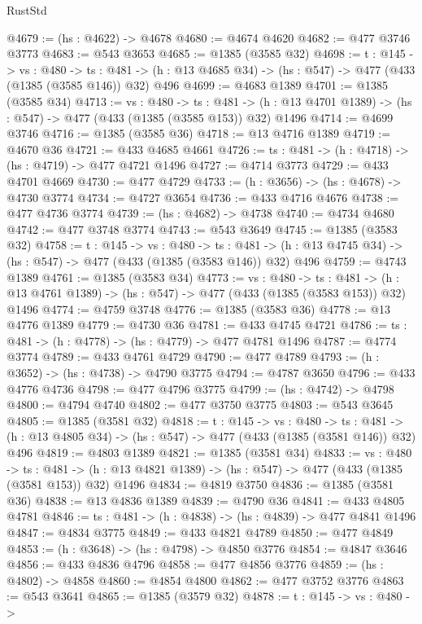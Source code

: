 \begin{lexlean}{RustStd}
\begin{coremodule}
{\begin{coremodule}
{{{{{{{{{{{{{{{{@4679 := (hs : @4622) -> @4678
@4680 := @4674 @4620
@4682 := @477 @3746 @3773
@4683 := @543 @3653
@4685 := @1385 (@3585 @32)
@4698 := {t : @145} ->
  {vs : @480} ->
  {ts : @481} -> (h : @13 @4685 @34) -> (hs : @547) -> @477 (@433 (@1385 (@3585 @146)) @32) @496
@4699 := @4683 @1389
@4701 := @1385 (@3585 @34)
@4713 := {vs : @480} ->
  {ts : @481} -> (h : @13 @4701 @1389) -> (hs : @547) -> @477 (@433 (@1385 (@3585 @153)) @32) @1496
@4714 := @4699 @3746
@4716 := @1385 (@3585 @36)
@4718 := @13 @4716 @1389
@4719 := @4670 @36
@4721 := @433 @4685 @4661
@4726 := {ts : @481} -> (h : @4718) -> (hs : @4719) -> @477 @4721 @1496
@4727 := @4714 @3773
@4729 := @433 @4701 @4669
@4730 := @477 @4729
@4733 := (h : @3656) -> (hs : @4678) -> @4730 @3774
@4734 := @4727 @3654
@4736 := @433 @4716 @4676
@4738 := @477 @4736 @3774
@4739 := (hs : @4682) -> @4738
@4740 := @4734 @4680
@4742 := @477 @3748 @3774
@4743 := @543 @3649
@4745 := @1385 (@3583 @32)
@4758 := {t : @145} ->
  {vs : @480} ->
  {ts : @481} -> (h : @13 @4745 @34) -> (hs : @547) -> @477 (@433 (@1385 (@3583 @146)) @32) @496
@4759 := @4743 @1389
@4761 := @1385 (@3583 @34)
@4773 := {vs : @480} ->
  {ts : @481} -> (h : @13 @4761 @1389) -> (hs : @547) -> @477 (@433 (@1385 (@3583 @153)) @32) @1496
@4774 := @4759 @3748
@4776 := @1385 (@3583 @36)
@4778 := @13 @4776 @1389
@4779 := @4730 @36
@4781 := @433 @4745 @4721
@4786 := {ts : @481} -> (h : @4778) -> (hs : @4779) -> @477 @4781 @1496
@4787 := @4774 @3774
@4789 := @433 @4761 @4729
@4790 := @477 @4789
@4793 := (h : @3652) -> (hs : @4738) -> @4790 @3775
@4794 := @4787 @3650
@4796 := @433 @4776 @4736
@4798 := @477 @4796 @3775
@4799 := (hs : @4742) -> @4798
@4800 := @4794 @4740
@4802 := @477 @3750 @3775
@4803 := @543 @3645
@4805 := @1385 (@3581 @32)
@4818 := {t : @145} ->
  {vs : @480} ->
  {ts : @481} -> (h : @13 @4805 @34) -> (hs : @547) -> @477 (@433 (@1385 (@3581 @146)) @32) @496
@4819 := @4803 @1389
@4821 := @1385 (@3581 @34)
@4833 := {vs : @480} ->
  {ts : @481} -> (h : @13 @4821 @1389) -> (hs : @547) -> @477 (@433 (@1385 (@3581 @153)) @32) @1496
@4834 := @4819 @3750
@4836 := @1385 (@3581 @36)
@4838 := @13 @4836 @1389
@4839 := @4790 @36
@4841 := @433 @4805 @4781
@4846 := {ts : @481} -> (h : @4838) -> (hs : @4839) -> @477 @4841 @1496
@4847 := @4834 @3775
@4849 := @433 @4821 @4789
@4850 := @477 @4849
@4853 := (h : @3648) -> (hs : @4798) -> @4850 @3776
@4854 := @4847 @3646
@4856 := @433 @4836 @4796
@4858 := @477 @4856 @3776
@4859 := (hs : @4802) -> @4858
@4860 := @4854 @4800
@4862 := @477 @3752 @3776
@4863 := @543 @3641
@4865 := @1385 (@3579 @32)
@4878 := {t : @145} ->
  {vs : @480} ->
}}}}}}}}}}}}}}}}
\end{coremodule}}
\end{coremodule}
\end{lexlean}

